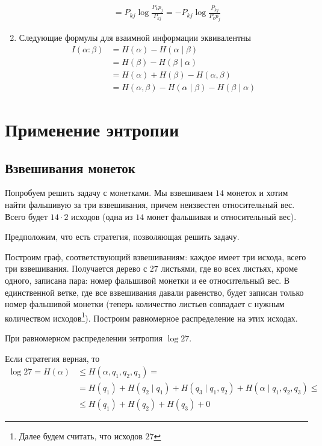 \begin{prop}
\begin{enumerate}
\begin{proof*}
\begin{align*}
		        \tag{по неравенству Йенсена} \\
		        &= P_{kj} \log \frac{P_k p_j}{P_{kj}} 
		        = -P_{kj} \log \frac{P_{kj}}{P_k p_j}
		    \end{align*}
		\end{proof*}
		\item  Следующие формулы для взаимной информации эквивалентны
			\begin{align*}
				I( \alpha : \beta ) 
				&= H( \alpha) - H( \alpha  \mid \beta  ) \\
				&= H( \beta ) - H( \beta \mid \alpha ) \\
				&= H\left( \alpha  \right) + H( \beta ) - H( \alpha , \beta ) \\
			    &= H( \alpha , \beta ) - H( \alpha \mid \beta ) - H( \beta \mid \alpha )
			\end{align*}
	\end{enumerate}
\end{prop}

\newpage
\section{Применение энтропии}
\subsection{Взвешивания монеток}
Попробуем решить задачу с монетками. Мы взвешиваем $ 14$ монеток и хотим найти фальшивую за три взвешивания, причем неизвестен относительный вес. Всего будет $14 \cdot 2$ исходов (одна из $14$ монет фальшивая и относительный вес).

Предположим, что есть стратегия, позволяющая решить задачу.

Построим граф, соответствующий взвешиваниям: каждое имеет три исхода, всего три взвешивания. Получается дерево с $27$ листьями, где во всех листьях, кроме одного, записана пара:
номер фальшивой монетки и ее относительный вес.
В единственной ветке, где все взвешивания давали равенство, будет записан только номер фальшивой монетки (теперь количество листьев совпадает с нужным количеством исходов\footnote{Далее будем считать, что исходов $27$}).
Построим равномерное распределение на этих исходах.

При равномерном распределении энтропия $ \log 27$.

Если стратегия верная, то
\begin{align*}
\log 27 = H(\alpha) &\le  H( \alpha, q_1, q_2, q_3) = \\ &= H( q_1 ) + H(q_{2} \mid q_1 )+ H(q_3 \mid q_1, q_2)+ H( \alpha  \mid q_1, q_2, q_3 ) \le \tag{Chain rule}\\  
			& \le  H(q_1) + H(q_2) + H(q_3) + 0
\end{align*}

